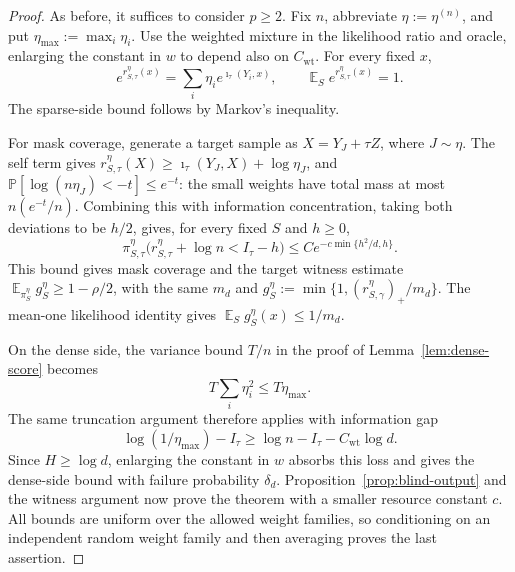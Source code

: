 \documentclass[10pt,a4paper]{amsart}
\DeclareMathOperator*{\E}{\mathbb{E}}
\newcommand{\Prob}{\mathbb P}
\theoremstyle{plain}
\theoremstyle{definition}
\theoremstyle{remark}
\begin{document}
\begin{proof}
As before, it suffices to consider \(p\ge2\).
Fix \(n\), abbreviate \(\eta:=\eta^{(n)}\), and put
\(\eta_{\max}:=\max_i\eta_i\).
Use the weighted mixture in the likelihood ratio and oracle, enlarging
the constant in \(w\) to depend also on \(C_{\mathrm{wt}}\).
For every fixed \(x\),
\[
   e^{r^\eta_{S,\tau}(x)}
   =\sum_i\eta_i e^{\imath_\tau(Y_i,x)},
   \qquad \E_S e^{r^\eta_{S,\tau}(x)}=1.
\]
The sparse-side bound follows by Markov's inequality.

For mask coverage, generate a target sample as \(X=Y_J+\tau Z\),
where \(J\sim\eta\).  The self term gives
\(r^\eta_{S,\tau}(X)\ge\imath_\tau(Y_J,X)+\log\eta_J\), and
\(\Prob[\log(n\eta_J)<-t]\le e^{-t}\): the small weights have
total mass at most \(n(e^{-t}/n)\).
Combining this with information concentration, taking both deviations
to be \(h/2\), gives, for every fixed \(S\) and \(h\ge0\),
\[
   \pi^\eta_{S,\tau}
   \bigl(r^\eta_{S,\tau}+\log n<I_\tau-h\bigr)
   \le C e^{-c\min\{h^2/d,h\}}.
\]
This bound gives mask coverage and the target witness estimate
\(\E_{\pi^\eta_S}g^\eta_S\ge1-\rho/2\), with the same \(m_d\)
and \(g^\eta_S:=\min\{1,(r^\eta_{S,\gamma})_+/m_d\}\).
The mean-one likelihood identity gives \(\E_Sg^\eta_S(x)\le1/m_d\).

On the dense side, the variance bound \(T/n\) in the proof of
Lemma~\ref{lem:dense-score} becomes
\[
   T\sum_i\eta_i^2\le T\eta_{\max}.
\]
The same truncation argument therefore applies with information gap
\[
   \log(1/\eta_{\max})-I_\tau
   \ge\log n-I_\tau-C_{\mathrm{wt}}\log d.
\]
Since \(H\ge\log d\), enlarging the constant in \(w\) absorbs this
loss and gives the dense-side bound with failure probability
\(\delta_d\).  Proposition~\ref{prop:blind-output} and the witness
argument now prove the theorem with a smaller resource constant \(c\).
All bounds are uniform over the allowed weight families, so conditioning
on an independent random weight family and then averaging proves the
last assertion.
\end{proof}
\end{document}
